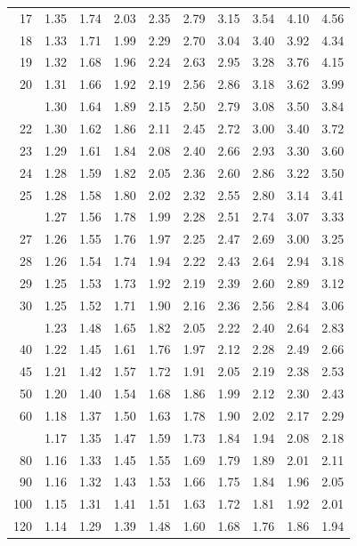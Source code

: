 \documentclass[10pt]{article}
\begin{document}
\begin{longtable}{@{}r!{\vrule width 0.8pt\hspace{0.55em}}rrrrrrrrr@{}}
17 & 1.35 & 1.74 & 2.03 & 2.35 & 2.79 & 3.15 & 3.54 & 4.10 & 4.56 \\
18 & 1.33 & 1.71 & 1.99 & 2.29 & 2.70 & 3.04 & 3.40 & 3.92 & 4.34 \\
19 & 1.32 & 1.68 & 1.96 & 2.24 & 2.63 & 2.95 & 3.28 & 3.76 & 4.15 \\
20 & 1.31 & 1.66 & 1.92 & 2.19 & 2.56 & 2.86 & 3.18 & 3.62 & 3.99 \\
 & 1.30 & 1.64 & 1.89 & 2.15 & 2.50 & 2.79 & 3.08 & 3.50 & 3.84 \\
22 & 1.30 & 1.62 & 1.86 & 2.11 & 2.45 & 2.72 & 3.00 & 3.40 & 3.72 \\
23 & 1.29 & 1.61 & 1.84 & 2.08 & 2.40 & 2.66 & 2.93 & 3.30 & 3.60 \\
24 & 1.28 & 1.59 & 1.82 & 2.05 & 2.36 & 2.60 & 2.86 & 3.22 & 3.50 \\
25 & 1.28 & 1.58 & 1.80 & 2.02 & 2.32 & 2.55 & 2.80 & 3.14 & 3.41 \\
 & 1.27 & 1.56 & 1.78 & 1.99 & 2.28 & 2.51 & 2.74 & 3.07 & 3.33 \\
27 & 1.26 & 1.55 & 1.76 & 1.97 & 2.25 & 2.47 & 2.69 & 3.00 & 3.25 \\
28 & 1.26 & 1.54 & 1.74 & 1.94 & 2.22 & 2.43 & 2.64 & 2.94 & 3.18 \\
29 & 1.25 & 1.53 & 1.73 & 1.92 & 2.19 & 2.39 & 2.60 & 2.89 & 3.12 \\
30 & 1.25 & 1.52 & 1.71 & 1.90 & 2.16 & 2.36 & 2.56 & 2.84 & 3.06 \\
 & 1.23 & 1.48 & 1.65 & 1.82 & 2.05 & 2.22 & 2.40 & 2.64 & 2.83 \\
40 & 1.22 & 1.45 & 1.61 & 1.76 & 1.97 & 2.12 & 2.28 & 2.49 & 2.66 \\
45 & 1.21 & 1.42 & 1.57 & 1.72 & 1.91 & 2.05 & 2.19 & 2.38 & 2.53 \\
50 & 1.20 & 1.40 & 1.54 & 1.68 & 1.86 & 1.99 & 2.12 & 2.30 & 2.43 \\
60 & 1.18 & 1.37 & 1.50 & 1.63 & 1.78 & 1.90 & 2.02 & 2.17 & 2.29 \\
 & 1.17 & 1.35 & 1.47 & 1.59 & 1.73 & 1.84 & 1.94 & 2.08 & 2.18 \\
80 & 1.16 & 1.33 & 1.45 & 1.55 & 1.69 & 1.79 & 1.89 & 2.01 & 2.11 \\
90 & 1.16 & 1.32 & 1.43 & 1.53 & 1.66 & 1.75 & 1.84 & 1.96 & 2.05 \\
100 & 1.15 & 1.31 & 1.41 & 1.51 & 1.63 & 1.72 & 1.81 & 1.92 & 2.01 \\
120 & 1.14 & 1.29 & 1.39 & 1.48 & 1.60 & 1.68 & 1.76 & 1.86 & 1.94 \\

\end{longtable}
\end{document}
